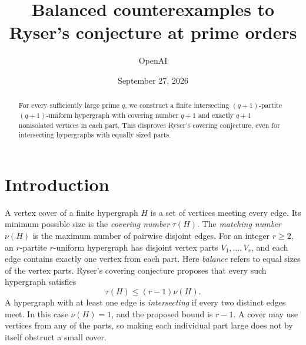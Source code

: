 \documentclass[11pt]{article}
\title{Balanced counterexamples to Ryser's conjecture at prime orders}
\author{OpenAI}
\date{September 27, 2026}
\theoremstyle{definition}
\theoremstyle{remark}
\begin{document}
\maketitle
\begin{abstract}
For every sufficiently large prime $q$, we construct a finite intersecting
$(q+1)$-partite $(q+1)$-uniform hypergraph with covering number $q+1$
and exactly $q+1$ nonisolated vertices in each part. This disproves
Ryser's covering conjecture, even for intersecting hypergraphs with
equally sized parts.
\end{abstract}

\section{Introduction}

A vertex cover of a finite hypergraph $H$ is a set of vertices meeting
every edge. Its minimum possible size is the \emph{covering number}
$\tau(H)$. The \emph{matching number} $\nu(H)$ is the maximum number of
pairwise disjoint edges. For an integer $r\ge2$, an $r$-partite
$r$-uniform hypergraph has disjoint vertex parts $V_1,\ldots,V_r$, and
each edge contains exactly one vertex from each part. Here \emph{balance}
refers to equal sizes of the vertex parts. Ryser's covering conjecture
proposes that every such hypergraph satisfies
\begin{equation}\label{eq:ryser}
 \tau(H)\le (r-1)\nu(H).
\end{equation}
A hypergraph with at least one edge is \emph{intersecting} if every two
distinct edges meet. In this case $\nu(H)=1$, and the proposed bound is $r-1$.
A cover may use vertices from any of the parts, so making each individual
part large does not by itself obstruct a small cover.
\end{document}
